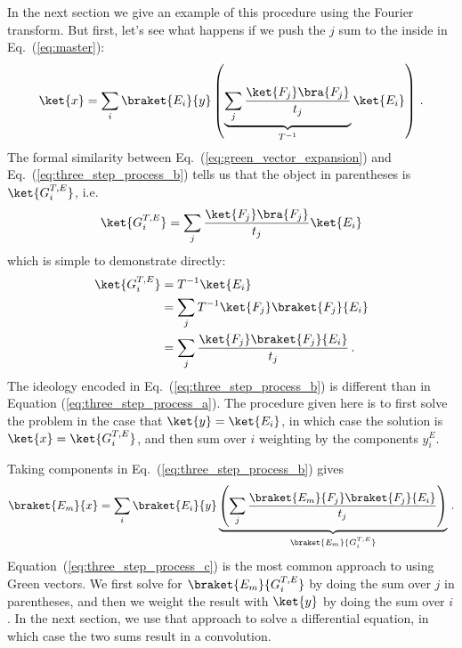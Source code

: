 In the next section we give an example of this procedure using the Fourier transform.
But first, let's see what happens if we push the $j$ sum to the inside in Eq.~(\ref{eq:master}):
\begin{equation}
  \ket{x}
  = \sum_i \braket{E_i}{y}
  \left(
    \underbrace{\sum_j \frac{\ket{F_j} \bra{F_j}}{t_j}}_{T^{-1}} \ket{E_i}
  \right)
  \, . \label{eq:three_step_process_b}  %
\end{equation}
The formal similarity between Eq.~(\ref{eq:green_vector_expansion}) and Eq.~(\ref{eq:three_step_process_b}) tells us that the object in parentheses is $\ket{G_i^{T,E}}$, i.e.
\begin{equation}
  \ket{G_i^{T,E}} = \sum_j \frac{\ket{F_j}\bra{F_j}}{t_j} \ket{E_i}
\end{equation}
which is simple to demonstrate directly:
\begin{align}
  \ket{G_i^{T,E}}
  &= T^{-1} \ket{E_i} \nonumber \\
  &= \sum_j T^{-1} \ket{F_j} \braket{F_j}{E_i} \nonumber \\
  &= \sum_j \frac{\ket{F_j} \braket{F_j}{E_i}}{t_j}
  \, .
\end{align}
The ideology encoded in Eq.~(\ref{eq:three_step_process_b}) is different than in Equation (\ref{eq:three_step_process_a}).
The procedure given here is to first solve the problem in the case that $\ket{y} = \ket{E_i}$, in which case the solution is $\ket{x} = \ket{G_i^{T, E}}$, and then sum over $i$ weighting by the components $y_i^E$.

Taking components in Eq.~(\ref{eq:three_step_process_b}) gives
\begin{equation}
  \braket{E_m}{x}
  = \sum_i \braket{E_i}{y}
  \underbrace{ \left( \sum_j \frac{\braket{E_m}{F_j} \braket{F_j}{E_i}}{t_j} \right)}_{\braket{E_m}{G_i^{T,E}}}
  \, . \label{eq:three_step_process_c}  %
\end{equation}
Equation~(\ref{eq:three_step_process_c}) is the most common approach to using Green vectors.
We first solve for $\braket{E_m}{G_i^{T,E}}$ by doing the sum over $j$ in parentheses, and then we weight the result with $\ket{y}$ by doing the sum over $i$.
In the next section, we use that approach to solve a differential equation, in which case the two sums result in a convolution.
